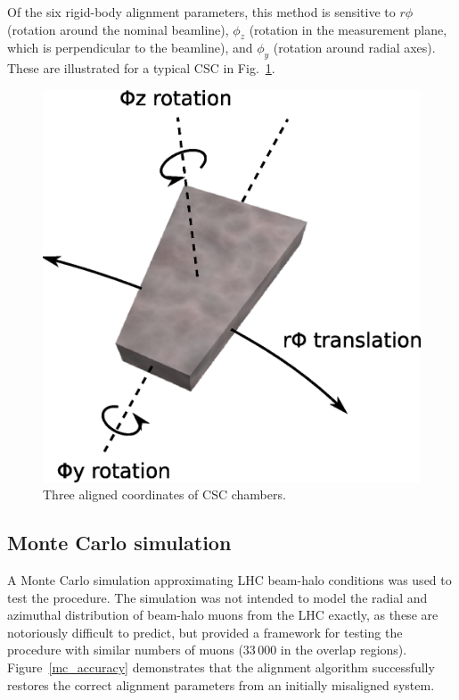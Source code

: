 Of the six rigid-body alignment parameters, this method is sensitive
to $r\phi$ (rotation around the nominal beamline), $\phi_z$ (rotation
in the measurement plane, which is perpendicular to the beamline), and
$\phi_y$ (rotation around radial axes).  These are illustrated for a
typical CSC in Fig.~\ref{csc_coordinates}.

\begin{figure}
\centering
\includegraphics[width=0.5\linewidth]{csc_coordinates.eps}
\caption{Three aligned coordinates of CSC chambers.} \label{csc_coordinates}
\end{figure}

\subsection{Monte Carlo simulation}

A Monte Carlo simulation approximating LHC beam-halo conditions was
used to test the procedure.  The simulation was not intended to model
the radial and azimuthal distribution of beam-halo muons from the LHC
exactly, as these are notoriously difficult to predict, but provided
a framework for testing the procedure with similar numbers of muons
($33\,000$ in the overlap regions).  Figure~\ref{mc_accuracy}
demonstrates that the alignment algorithm successfully restores the
correct alignment parameters from an initially misaligned system.

